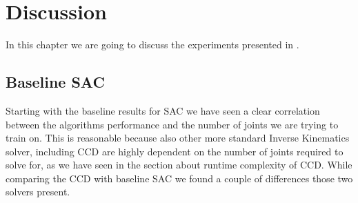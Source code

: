 \chapter{Discussion}\label{chap:discussion}

In this chapter we are going to discuss the experiments presented in .

\section{Baseline SAC}

Starting with the baseline results for SAC we have seen a clear correlation between the algorithms performance and the number of joints we are trying to train on. This is reasonable because also other more standard Inverse Kinematics solver, including CCD are highly dependent on the number of joints required to solve for, as we have seen in the section about runtime complexity of CCD. 
While comparing the CCD with baseline SAC we found a couple of differences those two solvers present.
